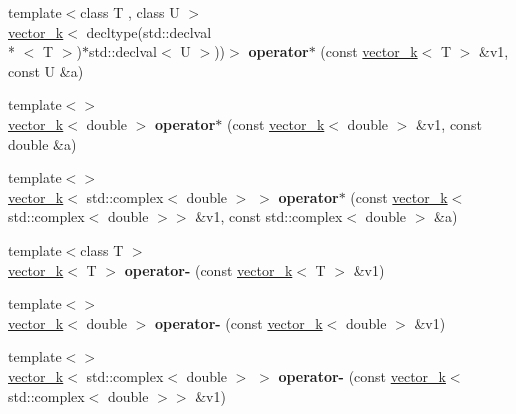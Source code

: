 \begin{DoxyCompactItemize}
\item 
\hypertarget{namespacekeycpp_a05f53ae281350225540bf5b4f4d1259b}{{\footnotesize template$<$class T , class U $>$ }\\\hyperlink{classkeycpp_1_1vector__k}{vector\-\_\-k}$<$ decltype(std\-::declval\\*
$<$ T $>$)$\ast$std\-::declval$<$ U $>$))$>$ {\bfseries operator$\ast$} (const \hyperlink{classkeycpp_1_1vector__k}{vector\-\_\-k}$<$ T $>$ \&v1, const U \&a)}\label{namespacekeycpp_a05f53ae281350225540bf5b4f4d1259b}

\item 
\hypertarget{namespacekeycpp_ad7f693a660597bd39cdca67ea4000a81}{{\footnotesize template$<$$>$ }\\\hyperlink{classkeycpp_1_1vector__k}{vector\-\_\-k}$<$ double $>$ {\bfseries operator$\ast$} (const \hyperlink{classkeycpp_1_1vector__k}{vector\-\_\-k}$<$ double $>$ \&v1, const double \&a)}\label{namespacekeycpp_ad7f693a660597bd39cdca67ea4000a81}

\item 
\hypertarget{namespacekeycpp_ab34753e2fc26c9fab1fcbee6700c691b}{{\footnotesize template$<$$>$ }\\\hyperlink{classkeycpp_1_1vector__k}{vector\-\_\-k}$<$ std\-::complex$<$ double $>$ $>$ {\bfseries operator$\ast$} (const \hyperlink{classkeycpp_1_1vector__k}{vector\-\_\-k}$<$ std\-::complex$<$ double $>$$>$ \&v1, const std\-::complex$<$ double $>$ \&a)}\label{namespacekeycpp_ab34753e2fc26c9fab1fcbee6700c691b}

\item 
\hypertarget{namespacekeycpp_a8afc5fb1383ec8d667f52ac3778df34c}{{\footnotesize template$<$class T $>$ }\\\hyperlink{classkeycpp_1_1vector__k}{vector\-\_\-k}$<$ T $>$ {\bfseries operator-\/} (const \hyperlink{classkeycpp_1_1vector__k}{vector\-\_\-k}$<$ T $>$ \&v1)}\label{namespacekeycpp_a8afc5fb1383ec8d667f52ac3778df34c}

\item 
\hypertarget{namespacekeycpp_a18d99849477754b35d0a3187ceb60508}{{\footnotesize template$<$$>$ }\\\hyperlink{classkeycpp_1_1vector__k}{vector\-\_\-k}$<$ double $>$ {\bfseries operator-\/} (const \hyperlink{classkeycpp_1_1vector__k}{vector\-\_\-k}$<$ double $>$ \&v1)}\label{namespacekeycpp_a18d99849477754b35d0a3187ceb60508}

\item 
\hypertarget{namespacekeycpp_a77245a0566dc6436443ad15187512ef0}{{\footnotesize template$<$$>$ }\\\hyperlink{classkeycpp_1_1vector__k}{vector\-\_\-k}$<$ std\-::complex$<$ double $>$ $>$ {\bfseries operator-\/} (const \hyperlink{classkeycpp_1_1vector__k}{vector\-\_\-k}$<$ std\-::complex$<$ double $>$$>$ \&v1)}\label{namespacekeycpp_a77245a0566dc6436443ad15187512ef0}


\end{DoxyCompactItemize}
